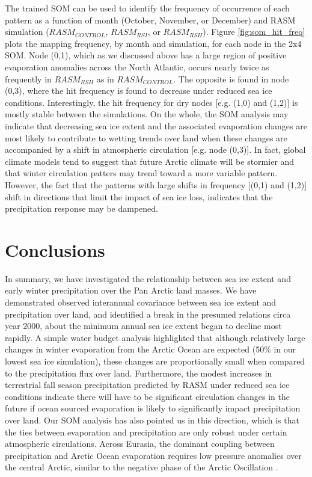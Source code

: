 The trained SOM can be used to identify the frequency of occurrence of each pattern as a function of month (October, November, or December) and RASM simulation ($RASM_{CONTROL}$, $RASM_{RSI}$, or $RASM_{RSH}$).
Figure \ref{fig:som_hit_freq} plots the mapping frequency, by month and simulation, for each node in the 2x4 SOM.
Node (0,1), which as we discussed above has a large region of positive evaporation anomalies across the North Atlantic, occurs nearly twice as frequently in $RASM_{RSH}$ as in $RASM_{CONTROL}$.
The opposite is found in node (0,3), where the hit frequency is found to decrease under reduced sea ice conditions.
Interestingly, the hit frequency for dry nodes [e.g. (1,0) and (1,2)] is mostly stable between the simulations.
On the whole, the SOM analysis may indicate that decreasing sea ice extent and the associated evaporation changes are most likely to contribute to wetting trends over land when these changes are accompanied by a shift in atmospheric circulation [e.g. node (0,3)].
In fact, global climate models tend to suggest that future Arctic climate will be stormier \citep{Vavrus_2012} and that winter circulation patters may trend toward a more variable pattern.
However, the fact that the patterns with large shifts in frequency [(0,1) and (1,2)] shift in directions that limit the impact of sea ice loss, indicates that the precipitation response may be dampened.

\section{Conclusions}
\label{sec:conclusions_ch5}

In summary, we have investigated the relationship between sea ice extent and early winter precipitation over the Pan Arctic land masses.
We have demonstrated observed interannual covariance between sea ice extent and precipitation over land, and identified a break in the presumed relations circa year 2000, about the minimum annual sea ice extent began to decline most rapidly.
A simple water budget analysis highlighted that although relatively large changes in winter evaporation from the Arctic Ocean are expected (50\% in our lowest sea ice simulation), these changes are proportionally small when compared to the precipitation flux over land.
Furthermore, the modest increases in terrestrial fall season precipitation predicted by RASM under reduced sea ice conditions indicate there will have to be significant circulation changes in the future if ocean sourced evaporation is likely to significantly impact precipitation over land.
Our SOM analysis has also pointed us in this direction, which is that the ties between evaporation and precipitation are only robust under certain atmospheric circulations.
Across Eurasia, the dominant coupling between precipitation and Arctic Ocean evaporation requires low pressure anomalies over the central Arctic, similar to the negative phase of the Arctic Oscillation \citep{Thompson_1998}.

